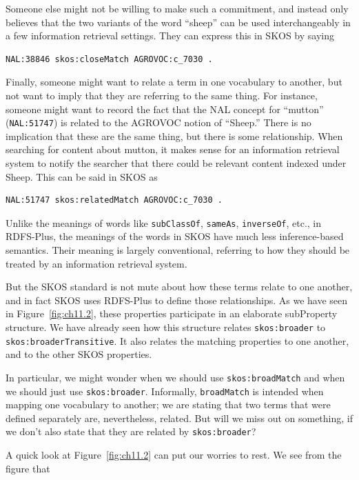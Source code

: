 Someone else might not be willing to make such a commitment, and instead
only believes that the two variants of the word ``sheep'' can be used
interchangeably in a few information retrieval settings. They can
express this in SKOS by saying

\begin{lstlisting}
NAL:38846 skos:closeMatch AGROVOC:c_7030 .
\end{lstlisting}

Finally, someone might want to relate a term in one vocabulary to
another, but not want to imply that they are referring to the same
thing. For instance, someone might want to record the fact that the NAL
concept for ``mutton'' (\texttt{NAL:51747}) is related to the AGROVOC notion of
``Sheep.'' There is no implication that these are the same thing, but
there is some relationship. When searching for content about mutton, it
makes sense for an information retrieval system to notify the searcher
that there could be relevant content indexed under Sheep. This can be
said in SKOS as

\begin{lstlisting}
NAL:51747 skos:relatedMatch AGROVOC:c_7030 .
\end{lstlisting}

Unlike the meanings of words like \texttt{subClassOf}, \texttt{sameAs}, \texttt{inverseOf}, etc.,
in RDFS-Plus, the meanings of the words in SKOS have much less
inference-based semantics. Their meaning is largely conventional,
referring to how they should be treated by an information retrieval
system.

But the SKOS standard is not mute about how these terms relate to one
another, and in fact SKOS uses RDFS-Plus to define those relationships.
As we have seen in Figure~\ref{fig:ch11.2}, these properties participate in an
elaborate subProperty structure. We have already seen how this structure
relates \texttt{skos:broader} to \texttt{skos:broaderTransitive}. It also relates the
matching properties to one another, and to the other SKOS properties.

In particular, we might wonder when we should use \texttt{skos:broadMatch} and
when we should just use \texttt{skos:broader}. Informally, \texttt{broadMatch} is intended
when mapping one vocabulary to another; we are stating that two terms
that were defined separately are, nevertheless, related. But will we
miss out on something, if we don't also state that they are related by
\texttt{skos:broader}?

A quick look at Figure~\ref{fig:ch11.2} can put our worries to rest. We see from the
figure that

